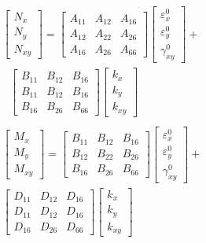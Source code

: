 \documentclass[Afour,sagev,times]{sagej}
\begin{document}
\begin{equation} \label{eq:force_and_moments}
	\begin{array}{l}
	\begin{bmatrix}
		N_x \\
		N_y \\
		N_{xy}
	\end{bmatrix}
	=
	\begin{bmatrix}
		A_{11} & A_{12} & A_{16} \\
		A_{12} & A_{22} & A_{26} \\
		A_{16} & A_{26} & A_{66} 
	\end{bmatrix}
    \begin{bmatrix}
		\varepsilon_x^0 \\
        \varepsilon_y^0 \\
		\gamma_{xy}^0
    \end{bmatrix}  
	+ \\ \text{             }
	\begin{bmatrix}
		B_{11} & B_{12} & B_{16} \\
		B_{11} & B_{12} & B_{16} \\
		B_{16} & B_{26} & B_{66} 
	\end{bmatrix}
	\begin{bmatrix}
		k_x \\
		k_y \\
		k_{xy} 
	\end{bmatrix}  \\
	\\

	\begin{bmatrix}
		M_x \\
		M_y \\
		M_{xy}
	\end{bmatrix}
	=
	\begin{bmatrix}
		B_{11} & B_{12} & B_{16} \\
		B_{12} & B_{22} & B_{26} \\
		B_{16} & B_{26} & B_{66} 
	\end{bmatrix}
    \begin{bmatrix}
		\varepsilon_x^0 \\
        \varepsilon_y^0 \\
		\gamma_{xy}^0
    \end{bmatrix} 
	+ \\
	\begin{bmatrix}
		D_{11} & D_{12} & D_{16} \\
		D_{11} & D_{12} & D_{16} \\
		D_{16} & D_{26} & D_{66} 
	\end{bmatrix}
	\begin{bmatrix}
		k_x \\
		k_y \\
		k_{xy} 
	\end{bmatrix}
	\end{array}
\end{equation}
\end{document}
